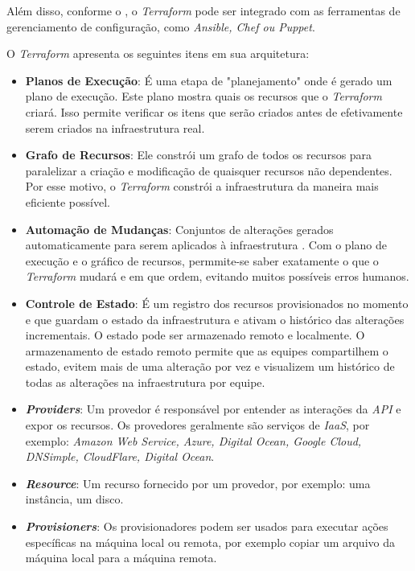 Além disso, conforme o , o \textit{Terraform} pode ser integrado com as ferramentas de gerenciamento de configuração, como \textit{Ansible, Chef ou Puppet}.

O \textit{Terraform} apresenta os seguintes itens em sua arquitetura:
 \begin{itemize}

\item \textbf{Planos de Execução}: É uma etapa de "planejamento"  onde é gerado um plano de execução. Este  plano mostra quais os recursos que o \textit{Terraform} criará. Isso permite verificar os itens que serão criados antes de efetivamente serem criados na infraestrutura real.

\item \textbf{Grafo de Recursos}: Ele constrói um grafo de todos os recursos para paralelizar a criação e modificação de quaisquer recursos não dependentes. Por esse motivo, o \textit{Terraform} constrói a infraestrutura da maneira mais eficiente possível.

\item \textbf{Automação de Mudanças}: Conjuntos de alterações gerados automaticamente para serem aplicados à infraestrutura . Com o plano de execução e o gráfico de recursos, permmite-se saber exatamente o que o \textit{Terraform} mudará e em que ordem, evitando muitos possíveis erros humanos.

\item \textbf{Controle de Estado}: É um registro dos recursos provisionados no momento e que guardam o estado da infraestrutura e ativam o histórico das alterações incrementais. O estado pode ser armazenado remoto e localmente. O armazenamento de estado remoto permite que as equipes compartilhem o estado, evitem mais de uma alteração por vez e visualizem um histórico de todas as alterações na infraestrutura por equipe.

\item \textbf{\textit{Providers}}: Um provedor é responsável por entender as interações da \textit{API} e expor os recursos. Os provedores geralmente são serviços de \textit{IaaS},  por exemplo: \textit{Amazon
Web Service, Azure, Digital Ocean, Google Cloud, DNSimple, CloudFlare, Digital Ocean}.

\item \textbf{\textit{Resource}}: Um recurso fornecido por um provedor, por exemplo: uma instância, um disco.   

\item \textbf{\textit{Provisioners}}: Os provisionadores podem ser usados para executar ações específicas na máquina local ou remota, por exemplo copiar um arquivo da máquina local para a máquina remota.


\end{itemize}
